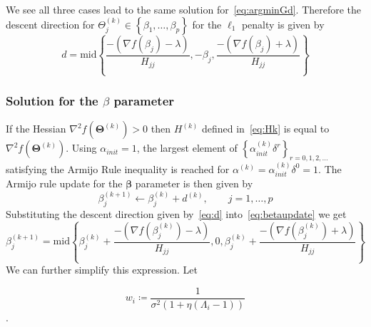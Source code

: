 \documentclass[12pt,letter]{article}\usepackage[]{graphicx}\usepackage[]{color}
\newcommand{\tm}[1]{\textrm{{#1}}}
\newcommand{\bX}{\textbf{X}}
\newcommand{\bXtilde}{\widetilde{\bX}}
\newcommand{\bTheta}{\boldsymbol{\Theta}}
\newcommand{\bbeta}{\boldsymbol{\beta}}
\begin{document}
We see all three cases lead to the same solution for~\eqref{eq:argminGd}. Therefore the descent direction for $\Theta_j^{(k)} \in \left\lbrace \beta_1, \ldots, \beta_p \right\rbrace$ for the $\ell_1$ penalty is given by
\begin{equation}
	d = \tm{mid}\left\lbrace \frac{-(\nabla f(\beta_{j}) - \lambda)}{H_{j j}}, -\beta_j ,\frac{-(\nabla f(\beta_{j}) + \lambda)}{H_{j j}} \right\rbrace  \label{eq:d}
\end{equation}

\subsubsection{Solution for the $\beta$ parameter} \label{ap:beta}
If the Hessian $\nabla^2f(\bTheta^{(k)}) >0$ then $H^{(k)}$ defined in~\eqref{eq:Hk} is equal to $\nabla^2f(\bTheta^{(k)})$. Using $\alpha_{init} = 1$, the largest element of $\left\lbrace \alpha_{init}^{(k)} \delta^r \right\rbrace_{r = 0, 1, 2, \ldots}$ satisfying the Armijo Rule inequality is reached for $\alpha^{(k)} = \alpha_{init}^{(k)}\delta^0 = 1$. The Armijo rule update for the $\bbeta$ parameter is then given by
\begin{equation}
	\beta_j^{(k+1)} \leftarrow \beta_j^{(k)} + d^{(k)}, \qquad j=1, \ldots, p \label{eq:betaupdate}
\end{equation}
Substituting the descent direction given by~\eqref{eq:d} into~\eqref{eq:betaupdate} we get
\begin{equation}
	\beta_j^{(k+1)} = \tm{mid}\left\lbrace \beta_j^{(k)}+ \frac{-(\nabla f(\beta_j^{(k)}) - \lambda)}{H_{j j}}, 0,\beta_j^{(k)}+ \frac{-(\nabla f(\beta_j^{(k)}) + \lambda)}{H_{j j}}  \right\rbrace \label{eq:betaMidpoint}
\end{equation}
We can further simplify this expression. Let %

\begin{equation}
	w_i \coloneqq \frac{1}{\sigma^2\left(1+\eta(\Lambda_i-1)\right)}
\end{equation}.
\end{document}
